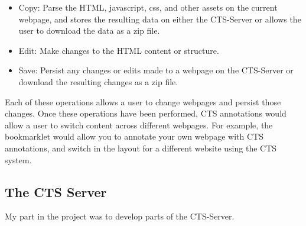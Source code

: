 \documentclass[12pt]{article}
\begin{document}
\begin{itemize}
  \item Copy: Parse the HTML, javascript, css, and other assets on the current webpage, and stores the resulting data on either the CTS-Server or allows the user to download the data as a zip file.
  \item Edit: Make changes to the HTML content or structure.
  \item Save: Persist any changes or edits made to a webpage on the CTS-Server or download the resulting changes as a zip file.
\end{itemize}

Each of these operations allows a user to change webpages and persist those changes. Once these operations have been performed, CTS annotations would allow a user to switch content across different webpages. For example, the bookmarklet would allow you to annotate your own webpage with CTS annotations, and switch in the layout for a different website using the CTS system.

\subsection{The CTS Server}

My part in the project was to develop parts of the CTS-Server.
\end{document}
